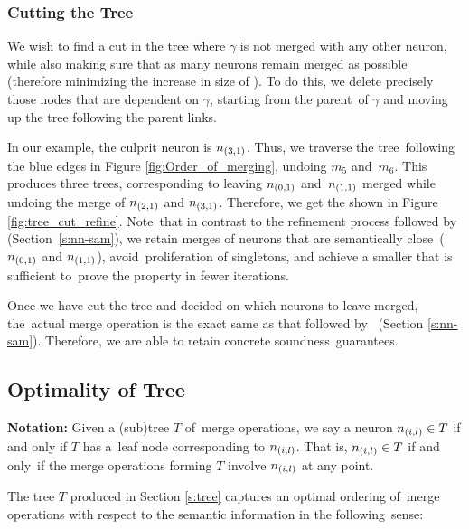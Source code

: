 \subsubsection{Cutting the Tree}

We wish to find a cut in the tree where $\gamma$ is not merged with any other neuron, while also making sure that as many neurons remain merged as possible (therefore minimizing the increase in size of \abs). To do this, we delete precisely those nodes that are dependent on $\gamma$, starting from the parent of $\gamma$ and moving up the tree following the parent links.

In our example, the culprit neuron is $n_{(3,1)}$. Thus, we traverse the tree following the blue edges in Figure \ref{fig:Order_of_merging}, undoing $m_5$ and $m_6$. This produces three trees, corresponding to leaving $n_{(0,1)}$ and $n_{(1,1)}$ merged while undoing the merge of $n_{(2,1)}$ and $n_{(3,1)}$.
Therefore, we get the \abs shown in Figure \ref{fig:tree_cut_refine}. Note that in contrast to the refinement process followed by \cite{cegar-nn} (Section \ref{s:nn-sam}), we retain merges of neurons that are semantically close ($n_{(0,1)}$ and $n_{(1,1)}$), avoid proliferation of singletons, and achieve a smaller \abs that is sufficient to prove the property in fewer iterations.

Once we have cut the tree and decided on which neurons to leave merged, the actual merge operation is the exact same as that followed by \cite{cegar-nn} (Section \ref{s:nn-sam}). Therefore, we are able to retain concrete soundness guarantees.



\subsection{Optimality of Tree}
\label{s:optimal-tree}

\textbf{Notation:} Given a (sub)tree $T$ of merge operations, we say a neuron $n_{(i,l)} \in T$ if and only if $T$ has a leaf node corresponding to $n_{(i,l)}$. That is, $n_{(i,l)} \in T$ if and only if the merge operations forming $T$ involve $n_{(i,l)}$ at any point.

The tree $T$ produced in Section \ref{s:tree} captures an optimal ordering of merge operations with respect to the semantic information in the following sense:



